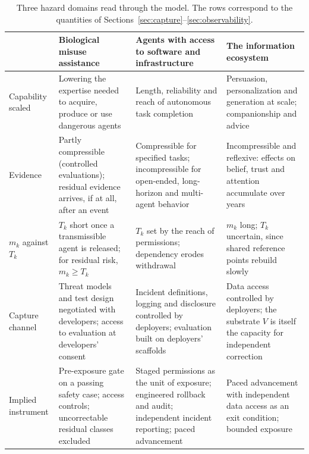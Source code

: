 \documentclass[11pt]{article}
\theoremstyle{plain}
\theoremstyle{definition}
\begin{document}
\begin{table}[t]
\centering
\small
\renewcommand{\arraystretch}{1.25}
\begin{tabularx}{\linewidth}{@{}>{\raggedright\arraybackslash}p{2.3cm}>{\raggedright\arraybackslash}X>{\raggedright\arraybackslash}X>{\raggedright\arraybackslash}X@{}}
\toprule
 & Biological misuse assistance & Agents with access to software and infrastructure & The information ecosystem \\
\midrule
Capability scaled & Lowering the expertise needed to acquire, produce or use dangerous agents & Length, reliability and reach of autonomous task completion & Persuasion, personalization and generation at scale; companionship and advice \\
Evidence & Partly compressible (controlled evaluations); residual evidence arrives, if at all, after an event & Compressible for specified tasks; incompressible for open-ended, long-horizon and multi-agent behavior & Incompressible and reflexive: effects on belief, trust and attention accumulate over years \\
$m_k$ against $T_k$ & $T_k$ short once a transmissible agent is released; for residual risk, $m_k\ge T_k$ & $T_k$ set by the reach of permissions; dependency erodes withdrawal & $m_k$ long; $T_k$ uncertain, since shared reference points rebuild slowly \\
Capture channel & Threat models and test design negotiated with developers; access to evaluation at developers' consent & Incident definitions, logging and disclosure controlled by deployers; evaluation built on deployers' scaffolds & Data access controlled by deployers; the substrate $V$ is itself the capacity for independent correction \\
Implied instrument & Pre-exposure gate on a passing safety case; access controls; uncorrectable residual classes excluded & Staged permissions as the unit of exposure; engineered rollback and audit; independent incident reporting; paced advancement & Paced advancement with independent data access as an exit condition; bounded exposure \\
\bottomrule
\end{tabularx}
\caption{Three hazard domains read through the model. The rows correspond to the quantities of Sections~\ref{sec:capture}--\ref{sec:observability}.}
\label{tab:domains}
\end{table}
\end{document}
